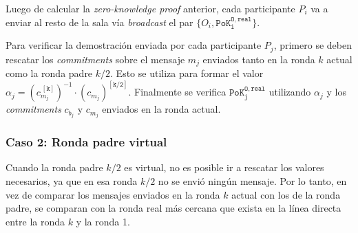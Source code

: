 Luego de calcular la \emph{zero-knowledge proof} anterior, cada participante 
$P_i$ va a enviar al resto de la sala vía \emph{broadcast} el par 
$\{O_i, \mathtt{PoK_i^{O, real}}\}$.

Para verificar la demostración enviada por cada participante $P_j$, primero se 
deben rescatar los \emph{commitments} sobre el mensaje $m_j$ enviados tanto en 
la ronda $k$ actual como la ronda padre $k/2$. Esto se utiliza para formar el 
valor 
$\alpha_j = {(c_{m_j}^\mathtt{\:[k]})^{-1}} \cdot {(c_{m_j})}^\mathtt{[k/2]}$. 
Finalmente se verifica $\mathtt{PoK_j^{O, real}}$ utilizando $\alpha_j$ y los 
\emph{commitments} $c_{b_j}$ y $c_{m_j}$ enviados en la ronda actual.

\subsubsection{Caso 2: Ronda padre virtual}

Cuando la ronda padre $k/2$ es virtual, no es posible ir a rescatar los 
valores necesarios, ya que en esa ronda $k/2$ no se envió ningún mensaje. Por 
lo tanto, en vez de comparar los mensajes enviados en la ronda $k$ actual con 
los de la ronda padre, se comparan con la ronda real más cercana que exista en 
la línea directa entre la ronda $k$ y la ronda 1.

